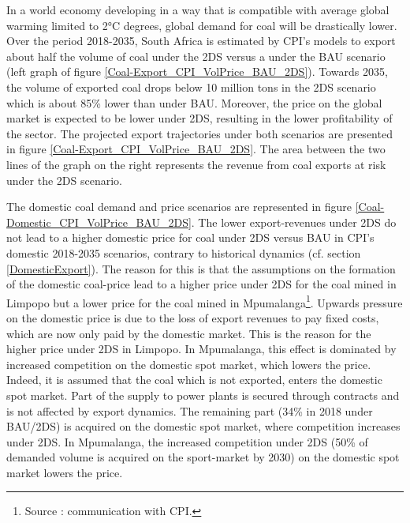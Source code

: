 \documentclass[12pt,english]{article}
\begin{document}
In a world economy developing in a way that is compatible with average global warming limited to 2°C degrees, global demand for coal will be drastically lower. Over the period 2018-2035, South Africa is estimated by CPI's models to export about half the volume of coal under the 2DS versus a under the BAU scenario (left graph of figure \ref{Coal-Export_CPI_VolPrice_BAU_2DS}). %
Towards 2035, the volume of exported coal drops below 10 million tons in the 2DS scenario which is about 85\% lower than under BAU. Moreover, the price on the global market is expected to be lower under 2DS, resulting in the lower profitability of the sector. %
The projected export trajectories under both scenarios are presented in figure \ref{Coal-Export_CPI_VolPrice_BAU_2DS}. The area between the two lines of the graph on the right represents the revenue from coal exports at risk under the 2DS scenario. %

The domestic coal demand and price scenarios are represented in figure \ref{Coal-Domestic_CPI_VolPrice_BAU_2DS}. The lower export-revenues under 2DS do not lead to a higher domestic price for coal under 2DS versus BAU in CPI's domestic 2018-2035 scenarios, contrary to historical dynamics (cf. section \ref{DomesticExport}). %
The reason for this is that the assumptions on the formation of the domestic coal-price lead to a higher price under 2DS for the coal mined in Limpopo but a lower price for the coal mined in Mpumalanga\footnote{Source :  communication with CPI.}. Upwards pressure on the domestic price is due to the loss of export revenues to pay fixed costs, which are now only paid by the domestic market. This is the reason for the higher price under 2DS in Limpopo. In Mpumalanga, this effect is dominated by increased competition  on the domestic spot market, which lowers the price. Indeed, it is assumed that the coal which is not exported, enters the domestic spot market. Part of the supply to power plants is secured through contracts and is not affected by export dynamics. The remaining part (34\% in 2018 under BAU/2DS) is acquired on the domestic spot market, where competition increases under 2DS. In Mpumalanga, the increased competition under 2DS (50\% of demanded volume is acquired on the sport-market by 2030) on the domestic spot market lowers the price. 
\end{document}

